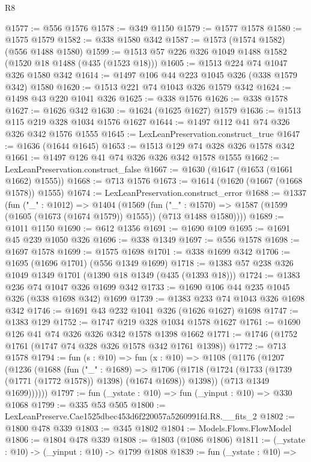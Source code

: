 \begin{lexlean}{R8}
\begin{coremodule}
@1577 := @556 @1576
@1578 := @349 @1150
@1579 := @1577 @1578
@1580 := @1575 @1579
@1582 := @338 @1580 @342
@1587 := @1573 (@1574 @1582) (@556 @1488 @1580)
@1599 := @1513 @57 @226 @326 @1049 @1488 @1582 (@1520 @18 @1488 (@435 (@1523 @18)))
@1605 := @1513 @224 @74 @1047 @326 @1580 @342
@1614 := @1497 @106 @44 @223 @1045 @326 (@338 @1579 @342) @1580
@1620 := @1513 @221 @74 @1043 @326 @1579 @342
@1624 := @1498 @43 @220 @1041 @326
@1625 := @338 @1576
@1626 := @338 @1578
@1627 := @1626 @342
@1630 := @1624 (@1625 @1627) @1579
@1636 := @1513 @115 @219 @328 @1034 @1576 @1627
@1644 := @1497 @112 @41 @74 @326 @326 @342 @1576 @1555
@1645 := LexLeanPreservation.construct_true
@1647 := @1636 (@1644 @1645)
@1653 := @1513 @129 @74 @328 @326 @1578 @342
@1661 := @1497 @126 @41 @74 @326 @326 @342 @1578 @1555
@1662 := LexLeanPreservation.construct_false
@1667 := @1630 (@1647 (@1653 (@1661 @1662) @1555))
@1668 := @713 @1576
@1673 := @1614 (@1620 (@1667 (@1668 @1578)) @1555)
@1674 := LexLeanPreservation.construct_error
@1688 := @1337
    (fun ("_" : @1012) =>
    @1404
      (@1569
        (fun ("_" : @1570) =>
        @1587 (@1599 (@1605 (@1673 (@1674 @1579)) @1555)) (@713 @1488 @1580))))
@1689 := @1011 @1150
@1690 := @612 @1356
@1691 := @1690 @109
@1695 := @1691 @45 @239 @1050 @326
@1696 := @338 @1349
@1697 := @556 @1578
@1698 := @1697 @1578
@1699 := @1575 @1698
@1701 := @338 @1699 @342
@1706 := @1695 (@1696 @1701) (@556 @1349 @1699)
@1718 := @1383 @57 @238 @326 @1049 @1349 @1701 (@1390 @18 @1349 (@435 (@1393 @18)))
@1724 := @1383 @236 @74 @1047 @326 @1699 @342
@1733 := @1690 @106 @44 @235 @1045 @326 (@338 @1698 @342) @1699
@1739 := @1383 @233 @74 @1043 @326 @1698 @342
@1746 := @1691 @43 @232 @1041 @326 (@1626 @1627) @1698
@1747 := @1383 @129
@1752 := @1747 @219 @328 @1034 @1578 @1627
@1761 := @1690 @126 @41 @74 @326 @326 @342 @1578 @1398 @1662
@1771 := @1746 (@1752 @1761 (@1747 @74 @328 @326 @1578 @342 @1761 @1398))
@1772 := @713 @1578
@1794 := fun (s : @10) =>
  fun (x : @10) =>
  @1108
    (@1176
      (@1207
        (@1236
          (@1688
            (fun ("_" : @1689) =>
            @1706
              (@1718 (@1724 (@1733 (@1739 (@1771 (@1772 @1578)) @1398) (@1674 @1698)) @1398))
              (@713 @1349 @1699))))))
@1797 := fun (_ystate : @10) => fun (_yinput : @10) => @330 @1068
@1799 := @335 @53 @505
@1800 := LexLeanPreserve.Cae1525dbec453d6f220057a5260991fd.R8.__fits_2
@1802 := @1800 @478 @339
@1803 := @345 @1802
@1804 := Models.Flows.FlowModel
@1806 := @1804 @478 @339
@1808 := @1803 (@1086 @1806)
@1811 := (_ystate : @10) -> (_yinput : @10) -> @1799 @1808
@1839 := fun (_ystate : @10) =>

\end{coremodule}
\end{lexlean}
